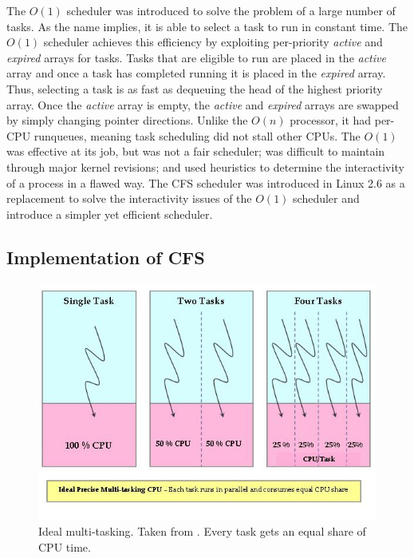 \documentclass{sig-alternate-10pt}
\begin{document}
The $ O(1) $ scheduler was introduced to solve the problem of a large number of tasks. As the name implies, it is able to select a task to run in constant time. The $ O(1) $ scheduler achieves this efficiency by exploiting per-priority \textit{active} and \textit{expired} arrays for tasks. Tasks that are eligible to run are placed in the \textit{active} array and once a task has completed running it is placed in the \textit{expired} array. Thus, selecting a task is as fast as dequeuing the head of the highest priority array. Once the \textit{active} array is empty, the \textit{active} and \emph{expired} arrays are swapped by simply changing pointer directions. Unlike the $ O(n) $ processor, it had per-CPU runqueues, meaning task scheduling did not stall other CPUs.
The $ O(1) $ was effective at its job, but was not a fair scheduler; was difficult to maintain through major kernel revisions; and used heuristics to determine the interactivity of a process in a flawed way. The CFS scheduler was introduced in Linux 2.6 as a replacement to solve the interactivity issues of the $ O(1) $ scheduler and introduce a simpler yet efficient scheduler.

\subsection{Implementation of CFS}

\begin{figure}
	\begin{center}
		\includegraphics[width=0.9\linewidth]{fig/mutlitasking.jpg}
		\caption{
			Ideal multi-tasking. Taken from \protect\cite{fig:multitask}. Every task gets an equal share of CPU time.
		}
		\label{fig:cfs_multitask}
	\end{center}
\end{figure}
\end{document}
